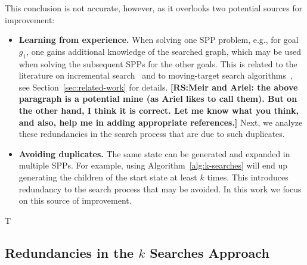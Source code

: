 \documentclass{aicom2e}
\newcommand{\roni}[1]{\textbf{[RS:#1]}}
\begin{document}
This conclusion is not accurate, however, as it overlooks two potential sources for improvement:
\begin{itemize}


\item {\bf Learning from experience.} When solving one SPP problem, e.g., for
goal $g_1$, one gains additional knowledge of the searched graph, which may be
used when solving the subsequent SPPs for the other goals. This is related to
the literature on incremental search~\cite{koenig2004lifelong} and to
moving-target search algorithms~\cite{ishida1995moving,koenig2007speeding}, see
Section~\ref{sec:related-work} for details.  \roni{Meir and Ariel: the above
paragraph is a potential mine (as Ariel likes to call them). But on the other
hand, I think it is correct. Let me know what you think, and also, help me in
adding appropriate references.} Next, we analyze these redundancies in the
search process that are due to such duplicates.


\item {\bf Avoiding duplicates.} The same state can be generated and expanded in
multiple SPPs. For example, using Algorithm~\ref{alg:k-searches} will end up
generating the children of the start state at least $k$ times. This introduces
redundancy to the search process that may be avoided. In this work we focus on
this source of improvement.

\end{itemize}

T

\subsection{Redundancies in the $k$ Searches Approach}
\end{document}
